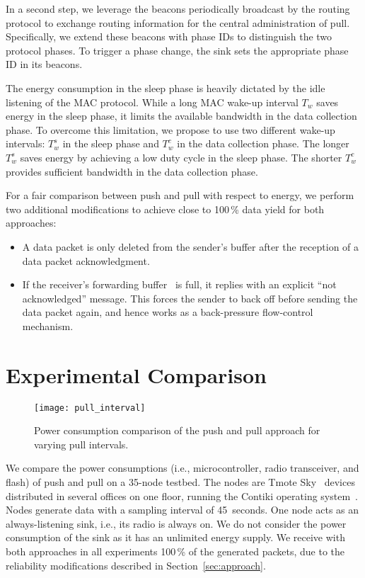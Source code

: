 \documentclass[10pt]{sensys-abstract}
\newcommand{\ie}{i.e.,\xspace}
\newcommand\secref[1]{Section~\ref{#1}}
\begin{document}
In a second step, we leverage the beacons periodically broadcast by the routing protocol to exchange routing information for the central administration of pull. Specifically, we extend these beacons with phase IDs to distinguish the two protocol phases. To trigger a phase change, the sink sets the appropriate phase ID in its beacons.

The energy consumption in the sleep phase is heavily dictated by the idle listening of the MAC protocol. While a long MAC wake-up interval $T_w$ saves energy in the sleep phase, it limits the available bandwidth in the data collection phase. To overcome this limitation, we propose to use two different wake-up intervals: $T_w^s$ in the sleep phase and $T_w^c$ in the data collection phase. The longer $T_w^s$ saves energy by achieving a low duty cycle in the sleep phase. The shorter $T_w^c$ provides sufficient bandwidth in the data collection phase.

For a fair comparison between push and pull with respect to energy, we perform two additional modifications to achieve close to 100$\,$\% data yield for both approaches:
\begin{itemize}
 \item A data packet is only deleted from the sender's buffer after the reception of a data packet acknowledgment.
 \item If the receiver's forwarding buffer~\cite{Gnawali2009b} is full, it replies with an explicit ``not acknowledged'' message. This forces the sender to back off before sending the data packet again, and hence works as a back-pressure flow-control mechanism.
\end{itemize}

\section{Experimental Comparison}

\begin{figure}
 \centering
 \texttt{[image: pull\_interval]}
 \caption{Power consumption comparison of the push and pull approach for varying pull intervals.}
 \label{fig:pull_int}
\end{figure}

We compare the power consumptions (\ie microcontroller, radio transceiver, and flash) of push and pull on a 35-node testbed. The nodes are Tmote Sky~\cite{Polastre05} devices distributed in several offices on one floor, running the Contiki operating system~\cite{Dunkels2004}. Nodes generate data with a sampling interval of 45~seconds. One node acts as an always-listening sink, \ie its radio is always on. We do not consider the power consumption of the sink as it has an unlimited energy supply. We receive with both approaches in all experiments 100$\,$\% of the generated packets, due to the reliability modifications described in \secref{sec:approach}.
\end{document}
